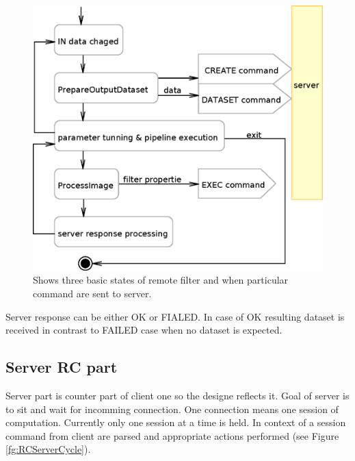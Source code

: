 \begin{figure}
    \centering
    \includegraphics[width=12cm]{data/RCClientCycle.eps}
    \caption[Remote Medv4D filter]{Shows three basic states of remote filter and when particular command are sent to server.}
    \label{fg:RCClientCycle}
\end{figure}

Server response can be either OK or FIALED. In case of OK resulting dataset is received in contrast to FAILED case when no dataset is expected.

\subsection{Server RC part}

Server part is counter part of client one so the designe reflects it. Goal of server is to sit and wait for incomming connection. One connection means one session of computation. Currently only one session at a time is held. In context of a session command from client are parsed and appropriate actions performed (see Figure \ref{fg:RCServerCycle}).

